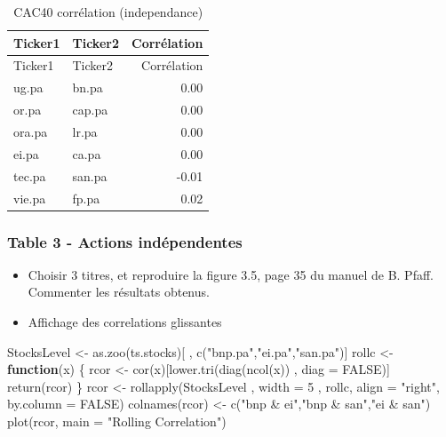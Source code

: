 \documentclass[
]{article}
\newenvironment{Shaded}{\begin{snugshade}}{\end{snugshade}}
\newcommand{\AttributeTok}[1]{\textcolor[rgb]{0.77,0.63,0.00}{#1}}
\newcommand{\ConstantTok}[1]{\textcolor[rgb]{0.00,0.00,0.00}{#1}}
\newcommand{\ControlFlowTok}[1]{\textcolor[rgb]{0.13,0.29,0.53}{\textbf{#1}}}
\newcommand{\DecValTok}[1]{\textcolor[rgb]{0.00,0.00,0.81}{#1}}
\newcommand{\FunctionTok}[1]{\textcolor[rgb]{0.00,0.00,0.00}{#1}}
\newcommand{\NormalTok}[1]{#1}
\newcommand{\OtherTok}[1]{\textcolor[rgb]{0.56,0.35,0.01}{#1}}
\newcommand{\StringTok}[1]{\textcolor[rgb]{0.31,0.60,0.02}{#1}}
\begin{document}
\begin{longtable}[]{@{}llr@{}}
\caption{CAC40 corrélation (independance)}\tabularnewline
\toprule
Ticker1 & Ticker2 & Corrélation\tabularnewline
\midrule
\endfirsthead
\toprule
Ticker1 & Ticker2 & Corrélation\tabularnewline
\midrule
\endhead
ug.pa & bn.pa & 0.00\tabularnewline
or.pa & cap.pa & 0.00\tabularnewline
ora.pa & lr.pa & 0.00\tabularnewline
ei.pa & ca.pa & 0.00\tabularnewline
tec.pa & san.pa & -0.01\tabularnewline
vie.pa & fp.pa & 0.02\tabularnewline
\bottomrule
\end{longtable}

\hypertarget{table-3---actions-induxe9pendentes}{%
\subsubsection{Table 3 - Actions
indépendentes}\label{table-3---actions-induxe9pendentes}}

\begin{itemize}
\item
  Choisir 3 titres, et reproduire la figure 3.5, page 35 du manuel de B.
  Pfaff. Commenter les résultats obtenus.
\item
  Affichage des correlations glissantes
\end{itemize}

\begin{Shaded}
\begin{Highlighting}[]
\NormalTok{StocksLevel }\OtherTok{\textless{}{-}} \FunctionTok{as.zoo}\NormalTok{(ts.stocks)[ , }\FunctionTok{c}\NormalTok{(}\StringTok{"bnp.pa"}\NormalTok{,}\StringTok{"ei.pa"}\NormalTok{,}\StringTok{"san.pa"}\NormalTok{)]}
\NormalTok{rollc }\OtherTok{\textless{}{-}} \ControlFlowTok{function}\NormalTok{(x) \{}
\NormalTok{  rcor }\OtherTok{\textless{}{-}} \FunctionTok{cor}\NormalTok{(x)[}\FunctionTok{lower.tri}\NormalTok{(}\FunctionTok{diag}\NormalTok{(}\FunctionTok{ncol}\NormalTok{(x)) , }\AttributeTok{diag =} \ConstantTok{FALSE}\NormalTok{)]}
  \FunctionTok{return}\NormalTok{(rcor)}
\NormalTok{\}}
\NormalTok{rcor }\OtherTok{\textless{}{-}} \FunctionTok{rollapply}\NormalTok{(StocksLevel , }\AttributeTok{width =} \DecValTok{5}\NormalTok{ , rollc, }\AttributeTok{align =} \StringTok{"right"}\NormalTok{, }
                  \AttributeTok{by.column =} \ConstantTok{FALSE}\NormalTok{)}
\FunctionTok{colnames}\NormalTok{(rcor) }\OtherTok{\textless{}{-}} \FunctionTok{c}\NormalTok{(}\StringTok{"bnp \& ei"}\NormalTok{,}\StringTok{"bnp \& san"}\NormalTok{,}\StringTok{"ei \& san"}\NormalTok{)}
\FunctionTok{plot}\NormalTok{(rcor, }\AttributeTok{main =} \StringTok{"Rolling Correlation"}\NormalTok{)}
\end{Highlighting}
\end{Shaded}
\end{document}
